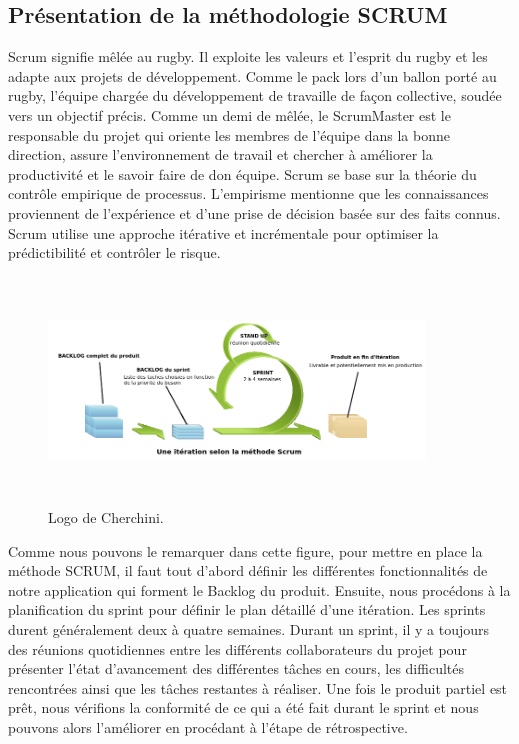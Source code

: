  \subsection{Pr\'{e}sentation de la m\'{e}thodologie SCRUM}
Scrum signifie m\^{e}l\'{e}e au rugby. Il exploite les valeurs et l'esprit du rugby et les adapte aux
projets de d\'{e}veloppement. Comme le pack lors d'un ballon port\'{e} au rugby, l'\'{e}quipe charg\'{e}e du
d\'{e}veloppement de travaille de fa\c{c}on collective, soud\'{e}e vers un objectif pr\'{e}cis. Comme un demi
de m\^{e}l\'{e}e, le ScrumMaster est le responsable du projet qui oriente les membres de l'\'{e}quipe dans
la bonne direction, assure l'environnement de travail et chercher \`{a} am\'{e}liorer la productivit\'{e} et
le savoir faire de don \'{e}quipe.
Scrum se base sur la th\'{e}orie du contr\^{o}le empirique de processus. L'empirisme mentionne que
les connaissances proviennent de l'exp\'{e}rience et d'une prise de d\'{e}cision bas\'{e}e sur des faits
connus. Scrum utilise une approche it\'{e}rative et incr\'{e}mentale pour optimiser la pr\'{e}dictibilit\'{e} et
contr\^{o}ler le risque.
\begin{figure}[H]
\center
\includegraphics[width=10cm,height=6cm]{./figures/scrum.png}
\caption{Logo de Cherchini.}

\end{figure}

Comme nous pouvons le remarquer dans cette figure, pour mettre en place la m\'{e}thode
SCRUM, il faut tout d'abord d\'{e}finir les diff\'{e}rentes fonctionnalit\'{e}s de notre application qui
forment le Backlog du produit. Ensuite, nous proc\'{e}dons \`{a} la planification du sprint pour d\'{e}finir
le plan d\'{e}taill\'{e} d'une it\'{e}ration. Les sprints durent g\'{e}n\'{e}ralement deux \`{a} quatre semaines. Durant
un sprint, il y a toujours des r\'{e}unions quotidiennes entre les diff\'{e}rents collaborateurs du projet
pour pr\'{e}senter l'\'{e}tat d'avancement des diff\'{e}rentes t\^{a}ches en cours, les difficult\'{e}s rencontr\'{e}es
ainsi que les t\^{a}ches restantes \`{a} r\'{e}aliser. Une fois le produit partiel est pr\^{e}t, nous v\'{e}rifions la
conformit\'{e} de ce qui a \'{e}t\'{e} fait durant le sprint et nous pouvons alors l'am\'{e}liorer en proc\'{e}dant \`{a}
l'\'{e}tape de r\'{e}trospective.


